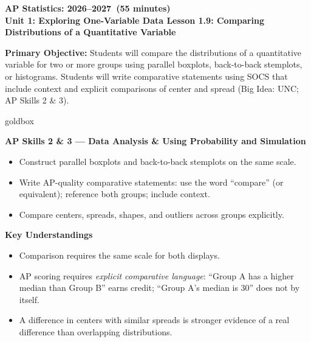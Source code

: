 \documentclass[10pt]{article}
\begin{document}
\def\CourseName{AP Statistics}
\def\SchoolYear{2026--2027}
\def\MeetingLength{55 minutes}
\def\UnitNumberName{Unit 1: Exploring One-Variable Data \quad}
\def\LessonNumberName{Lesson 1.9: Comparing Distributions of a Quantitative Variable}

\begin{center}
    {\Large\bfseries \CourseName: \SchoolYear\ (\MeetingLength) \\
    {\small\bfseries \UnitNumberName \LessonNumberName}}
\end{center}

\begin{tcolorbox}[colback=sky,colframe=navy,boxrule=0.9pt,arc=2mm,
    left=2mm,right=2mm,top=1.5mm,bottom=1.5mm]
    \textbf{Primary Objective:} Students will compare the distributions of a quantitative variable
    for two or more groups using parallel boxplots, back-to-back stemplots, or histograms. Students
    will write comparative statements using SOCS that include context and explicit comparisons of
    center and spread (Big Idea: UNC; AP Skills 2 \& 3).
\end{tcolorbox}

\begin{skillbox}{goldbox}
\begin{minipage}[t]{0.48\linewidth}
    \textbf{AP Skills 2 \& 3 --- Data Analysis \& Using Probability and Simulation}
    \begin{itemize}
        \item Construct parallel boxplots and back-to-back stemplots on the same scale.
        \item Write AP-quality comparative statements: use the word ``compare'' (or equivalent); reference both groups; include context.
        \item Compare centers, spreads, shapes, and outliers across groups explicitly.
    \end{itemize}
\end{minipage}
\hfill
\begin{minipage}[t]{0.48\linewidth}
    \textbf{Key Understandings}
    \begin{itemize}
        \item Comparison requires the same scale for both displays.
        \item AP scoring requires \textit{explicit comparative language}: ``Group A has a higher median than Group B'' earns credit; ``Group A's median is 30'' does not by itself.
        \item A difference in centers with similar spreads is stronger evidence of a real difference than overlapping distributions.
    \end{itemize}
\end{minipage}
\end{skillbox}
\end{document}
